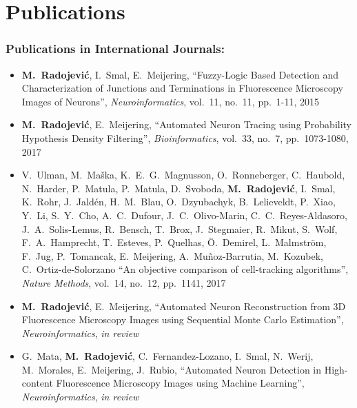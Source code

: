 %
%

\noquote
\orgchpos
\chapter*{Publications}
\label{publications}

\small
\normalsize

\subsection*{Publications in International Journals:}
\vspace{1ex}
\begin{itemize}
	\item \textbf{M.~Radojevi\'{c}}, I.~Smal, E.~Meijering, ``Fuzzy-Logic Based Detection and Characterization of Junctions and Terminations in Fluorescence Microscopy Images of Neurons'', \emph{Neuroinformatics}, vol.~11, no.~11, pp.~1-11, 2015
	
	\item \textbf{M.~Radojevi\'{c}}, E.~Meijering, ``Automated Neuron Tracing using Probability Hypothesis Density Filtering'', \emph{Bioinformatics}, vol.~33, no.~7, pp.~1073-1080, 2017
	
	\item V.~Ulman, M.~Ma\v{s}ka, K.~E.~G.~Magnusson, O.~Ronneberger, C.~Haubold, N.~Harder, P.~Matula, P.~Matula, D.~Svoboda, \textbf{M.~Radojevi\'{c}}, I.~Smal, K.~Rohr, J.~Jald\'{e}n, H.~M.~Blau, O.~Dzyubachyk, B.~Lelieveldt, P.~Xiao, Y.~Li, S.~Y.~Cho, A.~C.~Dufour,	J.~C.~Olivo-Marin, C.~C.~Reyes-Aldasoro, J.~A.~Solis-Lemus, R.~Bensch, T.~Brox, J.~Stegmaier, R.~Mikut, S.~Wolf,	F.~A.~Hamprecht, T.~Esteves, P.~Quelhas, \"{O}.~Demirel, L.~Malmstr\"{o}m, F.~Jug, P.~Tomancak, E.~Meijering, A.~Mu\~{n}oz-Barrutia, M.~Kozubek, C.~Ortiz-de-Solorzano ``An objective comparison of cell-tracking algorithms'', \emph{Nature Methods}, vol.~14, no.~12, pp.~1141, 2017
	
	\item \textbf{M.~Radojevi\'{c}}, E.~Meijering, ``Automated Neuron Reconstruction from 3D Fluorescence Microscopy Images using Sequential Monte Carlo Estimation'', \emph{Neuroinformatics}, \emph{in review}%
	
	\item G.~Mata, \textbf{M.~Radojevi\'{c}}, C.~Fernandez-Lozano, I.~Smal, N.~Werij, M.~Morales, E.~Meijering, J.~Rubio, ``Automated Neuron Detection in High-content Fluorescence Microscopy Images using Machine Learning'', \emph{Neuroinformatics}, \emph{in review}%
\end{itemize}

